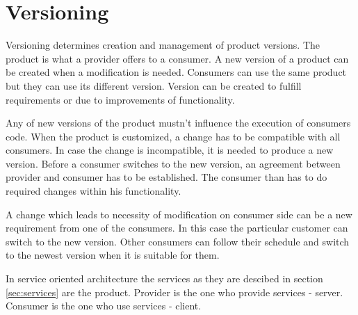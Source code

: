 \chapter{Versioning}
\label{chap:versioning}

Versioning determines creation and management of product versions. The product is what a provider offers to a consumer. A new version of a product can be created when a modification is needed. Consumers can use the same product but they can use its different version. Version can be created to fulfill requirements or due to improvements of functionality. 

Any of new versions of the product mustn't influence the execution of consumers code. When the product is customized, a change has to be compatible with all consumers. In case the change is incompatible, it is needed to produce a new version. Before a consumer switches to the new version, an agreement between provider and consumer has to be established. The consumer than has to do required changes within his functionality.

A change which leads to necessity of modification on consumer side can be a new requirement from one of the consumers. In this case the particular customer can switch to the new version. Other consumers can follow their schedule and switch to the newest version when it is suitable for them. 

In service oriented architecture the services as they are descibed in section \ref{sec:services} are the product. Provider is the one who provide services - server. Consumer is the one who use services - client.

